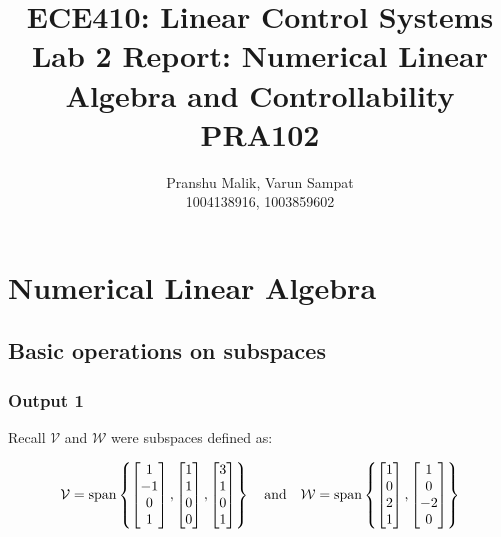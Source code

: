 \documentclass[10pt]{article}
\date{}
\begin{document}
\title{\textbf{\Large{\textsc{ECE410:} Linear Control Systems}} \\ \Large{Lab 2 Report: Numerical Linear Algebra and Controllability} \\ \textbf{\small{PRA102}}\vspace{-0.3cm}}
\author{Pranshu Malik, Varun Sampat \\ \footnotesize{1004138916}, \footnotesize{1003859602}\vspace{-3cm}}

\maketitle

\section{Numerical Linear Algebra}
\subsection{Basic operations on subspaces}
\subsubsection{Output 1}
Recall $ \mathcal{V} $ and $ \mathcal{W} $ were subspaces defined as:

\begin{equation*}
    \mathcal{V} = \text{span}
    \begin{Bmatrix}
        \begin{bmatrix} 1\\-1\\0\\1 \end{bmatrix},
        \begin{bmatrix} 1\\1\\0\\0 \end{bmatrix},
        \begin{bmatrix} 3\\1\\0\\1 \end{bmatrix}
    \end{Bmatrix}
    \quad
    \text{and}
    \quad
    \mathcal{W} = \text{span}
    \begin{Bmatrix}
        \begin{bmatrix} 1\\0\\2\\1 \end{bmatrix},
        \begin{bmatrix} 1\\0\\-2\\0 \end{bmatrix}
    \end{Bmatrix}
\end{equation*}
\end{document}

